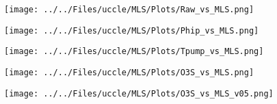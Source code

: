 \begin{frame}
\centering
\texttt{[image: ../../Files/uccle/MLS/Plots/Raw\_vs\_MLS.png]}\\
\end{frame}

    \begin{frame}
\texttt{[image: ../../Files/uccle/MLS/Plots/Phip\_vs\_MLS.png]}\\
\end{frame}

    \begin{frame}
\texttt{[image: ../../Files/uccle/MLS/Plots/Tpump\_vs\_MLS.png]}\\
\end{frame}

        \begin{frame}
\texttt{[image: ../../Files/uccle/MLS/Plots/O3S\_vs\_MLS.png]}\\
\end{frame}

            \begin{frame}
\texttt{[image: ../../Files/uccle/MLS/Plots/O3S\_vs\_MLS\_v05.png]}\\
\end{frame}




